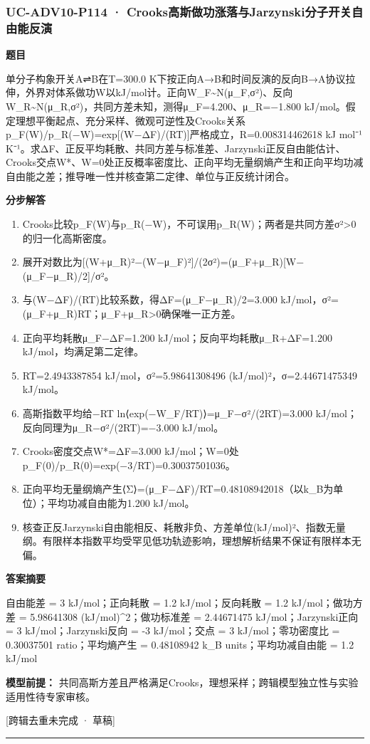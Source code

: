 \documentclass[UTF8,11pt,a4paper]{ctexart}
\begin{document}
\subsubsection*{UC-ADV10-P114 · Crooks高斯做功涨落与Jarzynski分子开关自由能反演}
\noindent\textbf{题目}\par
单分子构象开关A⇌B在T=300.0 K下按正向A→B和时间反演的反向B→A协议拉伸，外界对体系做功W以kJ/mol计。正向W\_F\textasciitilde{}N(μ\_F,σ²)、反向W\_R\textasciitilde{}N(μ\_R,σ²)，共同方差未知，测得μ\_F=4.200、μ\_R=−1.800 kJ/mol。假定理想平衡起点、充分采样、微观可逆性及Crooks关系p\_F(W)/p\_R(−W)=exp[(W−ΔF)/(RT)]严格成立，R=0.008314462618 kJ mol⁻¹ K⁻¹。求ΔF、正反平均耗散、共同方差与标准差、Jarzynski正反自由能估计、Crooks交点W*、W=0处正反概率密度比、正向平均无量纲熵产生和正向平均功减自由能之差；推导唯一性并核查第二定律、单位与正反统计闭合。\par
\medskip\noindent\textbf{分步解答}
\begin{enumerate}
\item Crooks比较p\_F(W)与p\_R(−W)，不可误用p\_R(W)；两者是共同方差σ²>0的归一化高斯密度。
\item 展开对数比为[(W+μ\_R)²−(W−μ\_F)²]/(2σ²)=(μ\_F+μ\_R)[W−(μ\_F−μ\_R)/2]/σ²。
\item 与(W−ΔF)/(RT)比较系数，得ΔF=(μ\_F−μ\_R)/2=3.000 kJ/mol，σ²=(μ\_F+μ\_R)RT；μ\_F+μ\_R>0确保唯一正方差。
\item 正向平均耗散μ\_F−ΔF=1.200 kJ/mol；反向平均耗散μ\_R+ΔF=1.200 kJ/mol，均满足第二定律。
\item RT=2.4943387854 kJ/mol，σ²=5.98641308496 (kJ/mol)²，σ=2.44671475349 kJ/mol。
\item 高斯指数平均给−RT ln⟨exp(−W\_F/RT)⟩=μ\_F−σ²/(2RT)=3.000 kJ/mol；反向同理为μ\_R−σ²/(2RT)=−3.000 kJ/mol。
\item Crooks密度交点W*=ΔF=3.000 kJ/mol；W=0处p\_F(0)/p\_R(0)=exp(−3/RT)=0.30037501036。
\item 正向平均无量纲熵产生⟨Σ⟩=(μ\_F−ΔF)/RT=0.48108942018（以k\_B为单位）；平均功减自由能为1.200 kJ/mol。
\item 核查正反Jarzynski自由能相反、耗散非负、方差单位(kJ/mol)²、指数无量纲。有限样本指数平均受罕见低功轨迹影响，理想解析结果不保证有限样本无偏。
\end{enumerate}
\noindent\textbf{答案摘要}\par
自由能差 = 3 kJ/mol；正向耗散 = 1.2 kJ/mol；反向耗散 = 1.2 kJ/mol；做功方差 = 5.98641308 (kJ/mol)\textasciicircum{}2；做功标准差 = 2.44671475 kJ/mol；Jarzynski正向 = 3 kJ/mol；Jarzynski反向 = -3 kJ/mol；交点 = 3 kJ/mol；零功密度比 = 0.30037501 ratio；平均熵产生 = 0.48108942 k\_B units；平均功减自由能 = 1.2 kJ/mol\par
\noindent\textbf{模型前提：}
共同高斯方差且严格满足Crooks，理想采样；跨辑模型独立性与实验适用性待专家审核。\par
\noindent\textcolor{red!65!black}{[跨辑去重未完成 · 草稿]} \par
\medskip\hrule\medskip
{}
\end{document}
